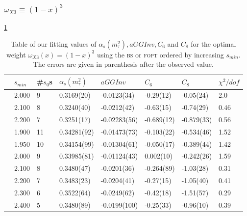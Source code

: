 \documentclass[../../index.tex]{subfiles}
\begin{document}
\subsubsection{\( \omega_{X3} \equiv (1-x)^3\)}
\cref{table:fitOpt30AlD4D6D8}
\begin{table}
  \centering
  \begin{tabular*}{\textwidth}{llllllll}
    \toprule
    & \(s_{min}\) & \#\(s_0\)s & \(\alpha_s(m_\tau^2)\) & \(aGGInv\) & \(C_{6}\) & \(C_{8}\) & \(\chi^2/dof\)  \\
    \midrule
    \parbox[t]{2mm}{} & 2.000 & 9 & 0.3169(20) & -0.0123(34) & -0.29(12) & -0.05(24) & 2.0 \\
    & 2.100 & 8 & 0.3240(40) & -0.0212(42) & -0.63(15) & -0.74(29) & 0.46 \\
    & 2.200 & 7 & 0.3251(17) & -0.02283(56) & -0.689(12) & -0.879(33) & 0.56 \\
    \midrule
    \parbox[t]{2mm}{} & 1.900 & 11 & 0.34281(92) & -0.01473(73) & -0.103(22) & -0.534(46) & 1.52 \\
    & 1.950 & 10 & 0.34154(99) & -0.01304(61) & -0.050(17) & -0.389(44) & 1.42 \\
    & 2.000 & 9  & 0.33985(81) & -0.01124(43) & 0.002(10) & -0.242(26) & 1.59 \\
    & 2.100 & 8  & 0.3480(47) & -0.0201(36) & -0.264(89) & -1.03(28) & 0.31 \\
    & 2.200 & 7  & 0.3483(23) & -0.0204(41) & -0.27(15) & -1.05(40) & 0.41 \\
    & 2.300 & 6  & 0.3522(64) & -0.0249(62) & -0.42(18) & -1.51(57) & 0.29 \\
    & 2.400 & 5  & 0.3480(89) & -0.0199(100) & -0.25(33) & -0.96(10) & 0.39 \\
    \bottomrule
  \end{tabular*}
  \caption{Table of our fitting values of \(\alpha_s(m_\tau^2), aGGInv, C_6\)
    and \(C_{8}\) for the optimal weight \(\omega_{X3}(x)=(1-x)^3\) using the
    \textsc{bs} or \textsc{fopt} ordered by increasing \(s_{min}\). The errors
    are given in parenthesis after the observed value.}
  \label{table:fitOpt30AlD4D6D8}
\end{table}
\end{document}
